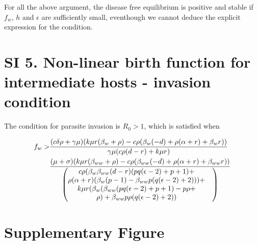 \documentclass[11pt]{article}
\begin{document}
For all the above argument, the disease free equilibrium is positive and stable if $f_w$, $h$ and $\epsilon$ are sufficiently small, eventhough we cannot deduce the explicit expression for the condition.

\section*{SI 5. Non-linear birth function for intermediate hosts - invasion condition}

The condition for parasite invasion is $R_0 > 1$, which is satisfied when

\begin{align}
	f_w > & \frac{(c \delta  \rho +\gamma  \mu ) (k \mu  r (\beta_w+\rho )-c \rho  (\beta_w (-d)+\rho  (\alpha +r)+\beta_w r))}{\gamma  \mu  (c \rho  (d-r)+k \mu  r)} \notag \\
	& \frac{(\mu +\sigma ) (k \mu  r (\beta_{ww}+\rho )-c \rho  (\beta_{ww} (-d)+\rho  (\alpha +r)+\beta_{ww} r))}{ \begin{pmatrix} c \rho  (\beta_w \beta_{ww} (d-r) (p q (\epsilon -2)+p+1) + & \\ 
			\rho  (\alpha +r) (\beta_w (p-1)-\beta_{ww} p (q (\epsilon -2)+2))) + & \\
			 k \mu  r (\beta_w (\beta_{ww} (p q (\epsilon -2)+p+1)-p \rho + & \\
			 \rho )+\beta_{ww} p \rho  (q (\epsilon -2)+2)) \end{pmatrix}}
\end{align}

\section*{Supplementary Figure}
\end{document}
